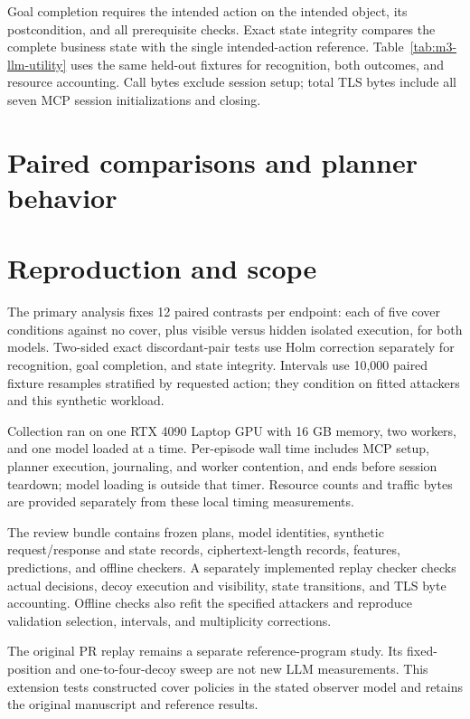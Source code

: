\documentclass[10pt,a4paper]{article}
\begin{document}
Goal completion requires the intended action on the intended object, its
postcondition, and all prerequisite checks. Exact state integrity compares
the complete business state with the single intended-action reference.
Table~\ref{tab:m3-llm-utility} uses the same held-out fixtures for recognition,
both outcomes, and resource accounting. Call bytes exclude session setup;
total TLS bytes include all seven MCP session initializations and closing.



\clearpage
\section{Paired comparisons and planner behavior}


\section{Reproduction and scope}
The primary analysis fixes 12 paired contrasts per endpoint: each of five
cover conditions against no cover, plus visible versus hidden isolated
execution, for both models. Two-sided exact discordant-pair tests use Holm
correction separately for recognition, goal completion, and state integrity.
Intervals use 10,000 paired fixture resamples stratified by requested action;
they condition on fitted attackers and this synthetic workload.

Collection ran on one RTX 4090 Laptop GPU with 16 GB memory, two workers,
and one model loaded at a time. Per-episode wall time includes MCP setup,
planner execution, journaling, and worker contention, and ends before session
teardown; model loading is outside that timer. Resource counts and traffic
bytes are provided separately from these local timing measurements.

The review bundle contains frozen plans, model identities, synthetic
request/response and state records, ciphertext-length records, features,
predictions, and offline checkers. A separately implemented replay checker checks actual
decisions, decoy execution and visibility, state transitions, and TLS byte
accounting. Offline checks also refit the specified attackers and reproduce
validation selection, intervals, and multiplicity corrections.

The original PR replay remains a separate reference-program study. Its
fixed-position and one-to-four-decoy sweep are not new LLM measurements.
This extension tests constructed cover policies in the stated observer
model and retains the original manuscript and reference results.
\end{document}
